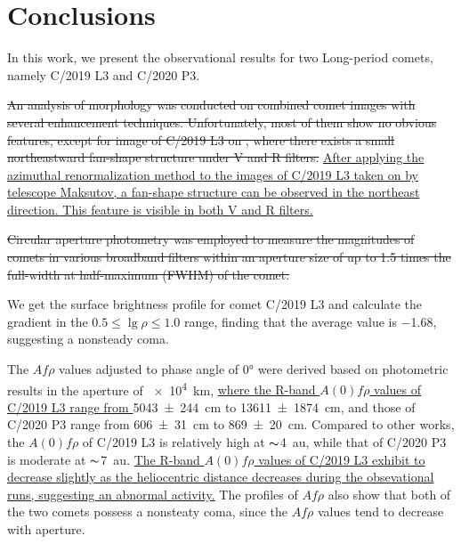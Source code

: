 \section{Conclusions} \label{sec:con}
In this work, we present the observational results for two Long-period comets, namely C/2019 L3 and C/2020 P3. 

\st{An analysis of morphology was conducted on combined comet images with several enhancement techniques. Unfortunately, most of them show no obvious features, except for image of C/2019 L3 on , where there exists a small northeastward fan-shape structure under V and R filters. }\ul{After applying the azimuthal renormalization method to the images of C/2019 L3 taken on  by telescope Maksutov, a fan-shape structure can be observed in the northeast direction. This feature is visible in both V and R filters. 
}

\st{Circular aperture photometry was employed to measure the magnitudes of comets in various broadband filters within an aperture size of up to 1.5 times the full-width at half-maximum (FWHM) of the comet. }

We get the surface brightness profile for comet C/2019 L3 and calculate the gradient in the $0.5 \leqslant \lg{\rho} \leqslant 1.0$ range, finding that the average value is \num{-1.68}, suggesting a nonsteady coma. 

The $Af\rho$ values adjusted to phase angle of \ang{0} were derived based on photometric results in the aperture of \SI{e4}{\km}, \ul{where the R-band $A(0)f\rho$ values of C/2019 L3 range from }{\qty{5043 +- 244}{\cm}} to {\qty{13611 +- 1874}{\cm}}, and those of C/2020 P3 range from {\qty{606 +- 31}{\cm}} to {\qty{869 +- 20}{\cm}}.
Compared to other works, the $A(0)f\rho$ of C/2019 L3 is relatively high at $\thicksim${\SI{4}{\astronomicalunit}}, while that of C/2020 P3 is moderate at $\thicksim${\SI{7}{\astronomicalunit}}. \ul{The R-band $A(0)f\rho$ values of C/2019 L3 exhibit to decrease slightly as the heliocentric distance decreases during the obsevational runs, suggesting an abnormal activity.} The profiles of $Af\rho$ also show that both of the two comets possess a nonsteaty coma, since the $Af\rho$ values tend to decrease with aperture. 

